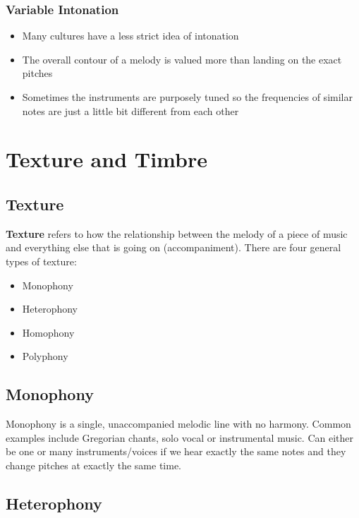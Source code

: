 \documentclass[12pt, a4paper]{report}
\begin{document}
  \subsection{Variable Intonation}

  \begin{itemize}
    \item Many cultures have a less strict idea of intonation
    \item The overall contour of a melody is valued more than landing on the exact pitches
    \item Sometimes the instruments are purposely tuned so the frequencies of similar notes are just a little bit different from each other
  \end{itemize}


  \chapter{Texture and Timbre}

  \section{Texture}

  \textbf{Texture} refers to how the relationship between the melody of a piece of music and everything else that is going on (accompaniment). There are four general types of texture:

  \begin{itemize}
    \item Monophony
    \item Heterophony
    \item Homophony
    \item Polyphony
  \end{itemize}

  \section{Monophony}

  Monophony is a single, unaccompanied melodic line with no harmony. Common examples include Gregorian chants, solo vocal or instrumental music. Can either be one or many instruments/voices if we hear exactly the same notes and they change pitches at exactly the same time.

  \section{Heterophony}
\end{document}

